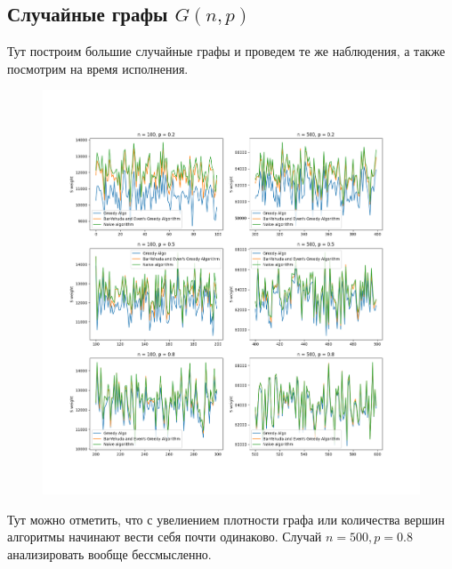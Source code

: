 \documentclass{article}
\theoremstyle{definition}
\begin{document}
  \subsection{Случайные графы $G(n, p)$}
  Тут построим большие случайные графы и проведем те же наблюдения, 
  а также посмотрим на время исполнения.
  \begin{figure}[H]
    \includegraphics[scale=0.5]{img/gnp_plots}
  \end{figure}
  Тут можно отметить, что с увелиением плотности графа или 
  количества вершин алгоритмы начинают вести себя почти одинаково.
  Случай $n=500, p=0.8$ анализировать вообще бессмысленно.
  
\end{document}
